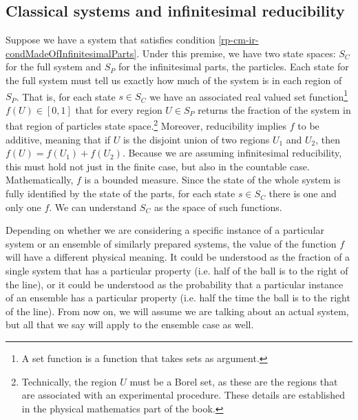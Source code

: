 \subsection{Classical systems and infinitesimal reducibility}

Suppose we have a system that satisfies condition  \ref{rp-cm-ir-condMadeOfInfinitesimalParts}. Under this premise, we have two state spaces: $S_C$ for the full system and $S_P$ for the infinitesimal parts, the particles. Each state for the full system must tell us exactly how much of the system is in each region of $S_P$. That is, for each state $s \in S_C$ we have an associated real valued set function\footnote{A set function is a function that takes sets as argument.} $f(U) \in [0,1]$ that for every region $U \in S_P$ returns the fraction of the system in that region of particles state space.\footnote{Technically, the region $U$ must be a Borel set, as these are the regions that are associated with an experimental procedure. These details are established in the physical mathematics part of the book.} Moreover, reducibility implies $f$ to be additive, meaning that if $U$ is the disjoint union of two regions $U_1$ and $U_2$, then $f(U) = f(U_1) + f(U_2)$. Because we are assuming infinitesimal reducibility, this must hold not just in the finite case, but also in the countable case. Mathematically, $f$ is a bounded measure. Since the state of the whole system is fully identified by the state of the parts, for each state $s \in S_C$ there is one and only one $f$. We can understand $S_C$ as the space of such functions.

Depending on whether we are considering a specific instance of a particular system or an ensemble of similarly prepared systems, the value of the function $f$ will have a different physical meaning. It could be understood as the fraction of a single system that has a particular property (i.e. half of the ball is to the right of the line), or it could be understood as the probability that a particular instance of an ensemble has a particular property (i.e. half the time the ball is to the right of the line). From now on, we will assume we are talking about an actual system, but all that we say will apply to the ensemble case as well.

